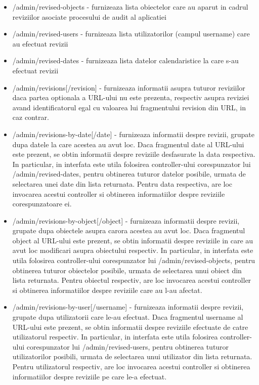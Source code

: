 \begin{itemize}
\item{/admin/revised-objects - furnizeaza lista obiectelor care au aparut in cadrul reviziilor asociate procesului de audit al aplicatiei}
\item{/admin/revised-users - furnizeaza lista utilizatorilor (campul username) care au efectuat revizii}
\item{/admin/revised-dates - furnizeaza lista datelor calendaristice la care s-au efectuat revizii}
\item{/admin/revisions[/{revision}] - furnizeaza informatii asupra tuturor reviziilor daca partea optionala a URL-ului nu este prezenta, respectiv asupra reviziei avand identificatorul egal cu valoarea lui fragmentului revision din URL, in caz contrar.}
\item{/admin/revisions-by-date[/{date}] - furnizeaza informatii despre revizii, grupate dupa datele la care acestea au avut loc. Daca fragmentul date al URL-ului este prezent, se obtin informatii despre reviziile desfasurate la data respectiva. In particular, in interfata este utila folosirea controller-ului corespunzator lui /admin/revised-dates, pentru obtinerea tuturor datelor posibile, urmata de selectarea unei date din lista returnata. Pentru data respectiva, are loc invocarea acestui controller si obtinerea informatiilor despre reviziile corespunzatoare ei.}
\item{/admin/revisions-by-object[/{object}] - furnizeaza informatii despre revizii, grupate dupa obiectele asupra carora acestea au avut loc. Daca fragmentul object al URL-ului este prezent, se obtin informatii despre reviziile in care au avut loc modificari asupra obiectului respectiv. In particular, in interfata este utila folosirea controller-ului corespunzator lui /admin/revised-objects, pentru obtinerea tuturor obiectelor posibile, urmata de selectarea unui obiect din lista returnata. Pentru obiectul respectiv, are loc invocarea acestui controller si obtinerea informatiilor despre reviziile care au l-au afectat.}
\item{/admin/revisions-by-user[/{username}] - furnizeaza informatii despre revizii, grupate dupa utilizatorii care le-au efectuat. Daca fragmentul username al URL-ului este prezent, se obtin informatii despre reviziile efectuate de catre utilizatorul respectiv. In particular, in interfata este utila folosirea controller-ului corespunzator lui /admin/revised-users, pentru obtinerea tuturor utilizatorilor posibili, urmata de selectarea unui utilizator din lista returnata. Pentru utilizatorul respectiv, are loc invocarea acestui controller si obtinerea informatiilor despre reviziile pe care le-a efectuat.}

\end{itemize}
